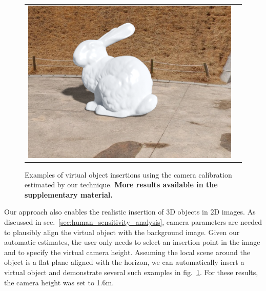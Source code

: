 \begin{figure}
\begin{tabular}{@{}cc@{}}
\includegraphics[width=\voiwidth\linewidth]{figures/applications/virtual_object_insertions/pano_abpebgbgmpccye_jpg-6_5_es.png}
\end{tabular}
\caption{Examples of virtual object insertions using the camera calibration estimated by our technique. \textbf{More results available in the supplementary material.}\vspace{-0.5em}}
\label{fig:applications_virtual_object_insertion}
\end{figure}

Our approach also enables the realistic insertion of 3D objects in 2D images. As discussed in sec.~\ref{sec:human_sensitivity_analysis}, camera parameters are needed to plausibly align the virtual object with the background image. Given our automatic estimates, the user only needs to select an insertion point in the image and to specify the virtual camera height. Assuming the local scene around the object is a flat plane aligned with the horizon, we can automatically insert a virtual object and demonstrate several such examples in fig.~\ref{fig:applications_virtual_object_insertion}. For these results, the camera height was set to 1.6m. 


